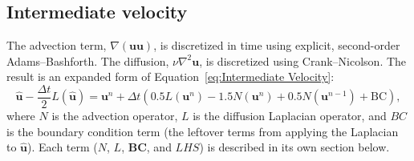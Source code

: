 \subsection{Intermediate velocity}
\label{sec:ID NS intermediate velocity}

The advection term, $\nabla (\textbf{uu})$, is discretized in time using explicit, second-order Adams--Bashforth. 
The diffusion, $\nu \nabla^2 \textbf{u}$, is discretized using Crank--Nicolson. 
The result is an expanded form of Equation~\eqref{eq:Intermediate Velocity}: 
\begin{equation}
\label{eq:Expanded Intermediate Velocity}
\hat{\textbf{u}} - \frac{\Delta t}{2}L(\hat{\textbf{u}}) = \textbf{u}^n + \Delta t\left(0.5L(\textbf{u}^n) - 1.5N(\textbf{u}^n) + 0.5N(\textbf{u}^{n-1}) + \text{BC}\right),
\end{equation}
where $N$ is the advection operator, $L$ is the diffusion Laplacian operator, and $BC$ is the boundary condition term (the leftover terms from applying the Laplacian to $\hat{\textbf{u}}$). 
Each term ($N$, $L$, $\textbf{BC}$, and $LHS$) is described in its own section below. 

